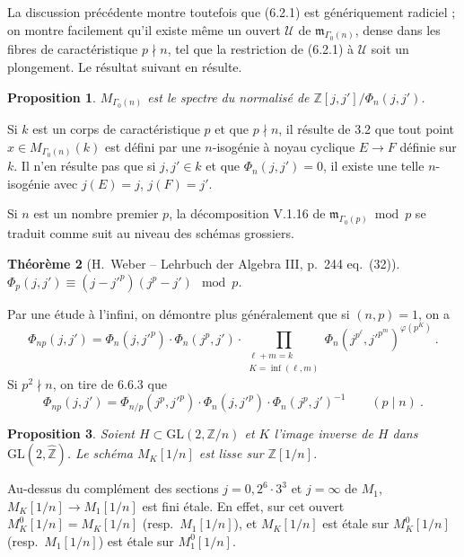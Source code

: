 \documentclass[10pt,a4paper]{amsart}
\theoremstyle{plain}
\newtheorem{theorem}{Th\'eor\`eme}[section]
\newtheorem{proposition}[theorem]{Proposition}
\theoremstyle{definition}
\newcommand{\m}{\mathfrak{m}}
\newcommand{\ZZ}{\mathbb{Z}}
\newcommand{\cU}{\mathcal{U}}
\newcommand{\GL}{\mathrm{GL}}
\begin{document}
La discussion pr\'ec\'edente montre toutefois que (6.2.1) est g\'en\'eriquement radiciel ; on montre facilement qu'il existe m\^eme un ouvert $\cU$ de $\m_{\Gamma_0(n)}$, dense dans les fibres de caract\'eristique $p \nmid n$, tel que la restriction de (6.2.1) \`a $\cU$ soit un plongement. Le r\'esultat suivant en r\'esulte.

\setcounter{theorem}{4}
\begin{proposition}
$M_{\Gamma_0(n)}$ est le spectre du normalis\'e de $\ZZ[j,j']/\Phi_n(j,j')$.
\end{proposition}

Si $k$ est un corps de caract\'eristique $p$ et que $p \nmid n$, il r\'esulte de 3.2 que tout point $x \in M_{\Gamma_0(n)}(k)$ est d\'efini par une $n$-isog\'enie \`a noyau cyclique $E \to F$ d\'efinie sur $k$. Il n'en r\'esulte pas que si $j, j' \in k$ et que $\Phi_n(j,j') = 0$, il existe une telle $n$-isog\'enie avec $j(E) = j$, $j(F) = j'$.

Si $n$ est un nombre premier $p$, la d\'ecomposition V.1.16 de $\m_{\Gamma_0(p)} \bmod p$ se traduit comme suit au niveau des sch\'emas grossiers.

\setcounter{theorem}{5}
\begin{theorem}[H.\ Weber -- Lehrbuch der Algebra III, p.\ 244 eq.\ (32)]
$\Phi_p(j,j') \equiv (j - j'^p)(j^p - j') \mod p$.
\end{theorem}

Par une \'etude \`a l'infini, on d\'emontre plus g\'en\'eralement que si $(n,p) = 1$, on a
\begin{equation}
\Phi_{np}(j,j') = \Phi_n(j,j'^p) \cdot \Phi_n(j^p,j') \cdot \prod_{\substack{\ell+m=k \\ K=\inf(\ell,m)}} \Phi_n(j^{p^\ell}, j'^{p^m})^{\varphi(p^K)}\ .
\end{equation}
Si $p^2 \nmid n$, on tire de 6.6.3 que
\begin{equation}
\Phi_{np}(j,j') = \Phi_{n/p}(j^{p}, j'^{p}) \cdot \Phi_n(j, j'^p) \cdot \Phi_n(j^p, j')^{-1} \qquad (p \mid n)\ .
\end{equation}

\setcounter{theorem}{6}
\begin{proposition}
Soient $H \subset \GL(2,\ZZ/n)$ et $K$ l'image inverse de $H$ dans $\GL(2,\hat{\ZZ})$. Le sch\'ema $M_K[1/n]$ est lisse sur $\ZZ[1/n]$.
\end{proposition}

Au-dessus du compl\'ement des sections $j = 0, 2^6 \cdot 3^3$ et $j = \infty$ de $M_1$, $M_K[1/n] \to M_1[1/n]$ est fini \'etale. En effet, sur cet ouvert $M_K^0[1/n] = M_K[1/n]$ (resp.\ $M_1[1/n]$), et $M_K[1/n]$ est \'etale sur $M_K^0[1/n]$ (resp.\ $M_1[1/n]$) est \'etale sur $M_1^0[1/n]$.
\end{document}
